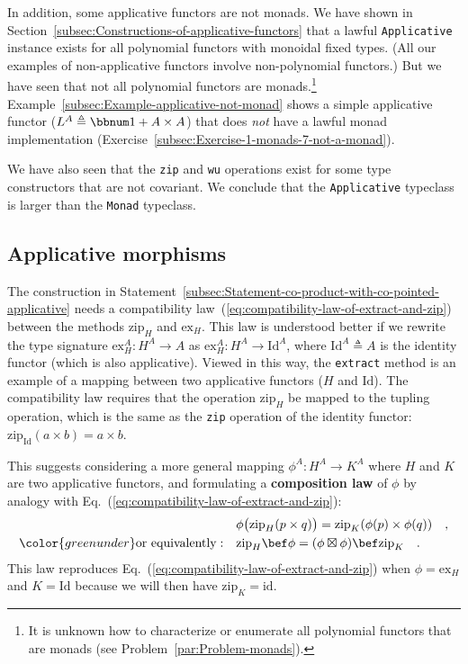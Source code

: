 In addition, some applicative functors are not monads. We have shown
in Section~\ref{subsec:Constructions-of-applicative-functors} that
a lawful \lstinline!Applicative! instance exists for all polynomial
functors with monoidal fixed types. (All our examples of non-applicative
functors involve non-polynomial functors.) But we have seen that not
all polynomial functors are monads.\footnote{It is unknown how to characterize or enumerate all polynomial functors
that are monads (see Problem~\ref{par:Problem-monads}).} Example~\ref{subsec:Example-applicative-not-monad} shows a simple
applicative functor ($L^{A}\triangleq\bbnum 1+A\times A$)
that does \emph{not} have a lawful monad implementation (Exercise~\ref{subsec:Exercise-1-monads-7-not-a-monad}).

We have also seen that the \lstinline!zip! and \lstinline!wu! operations
exist for some type constructors that are not covariant. We conclude
that the \lstinline!Applicative! typeclass is larger than the \lstinline!Monad!
typeclass.

\subsection{Applicative morphisms\label{subsec:Applicative-morphisms}}

The construction in Statement~\ref{subsec:Statement-co-product-with-co-pointed-applicative}
needs a compatibility law~(\ref{eq:compatibility-law-of-extract-and-zip})
between the methods $\text{zip}_{H}$ and $\text{ex}_{H}$. This law
is understood better if we rewrite the type signature $\text{ex}_{H}^{A}:H^{A}\rightarrow A$
as $\text{ex}_{H}^{A}:H^{A}\rightarrow\text{Id}^{A}$, where $\text{Id}^{A}\triangleq A$
is the identity functor (which is also applicative). Viewed in this
way, the \lstinline!extract! method is an example of a mapping between
two applicative functors ($H$ and $\text{Id}$). The compatibility
law requires that the operation $\text{zip}_{H}$ be mapped to the
tupling operation, which is the same as the \lstinline!zip! operation
of the identity functor: $\text{zip}_{\text{Id}}(a\times b)=a\times b$.

This suggests considering a more general mapping $\phi^{A}:H^{A}\rightarrow K^{A}$
where $H$ and $K$ are two applicative functors, and formulating
a \textbf{composition law}
of $\phi$ by analogy with Eq.~(\ref{eq:compatibility-law-of-extract-and-zip}):
\begin{align*}
 & \phi\big(\text{zip}_{H}(p\times q)\big)=\text{zip}_{K}(\phi(p)\times\phi(q))\quad,\\
{\color{greenunder}\text{or equivalently}:}\quad & \text{zip}_{H}\bef\phi=(\phi\boxtimes\phi)\bef\text{zip}_{K}\quad.
\end{align*}
This law reproduces Eq.~(\ref{eq:compatibility-law-of-extract-and-zip})
when $\phi=\text{ex}_{H}$ and $K=\text{Id}$ because we will then
have $\text{zip}_{K}=\text{id}$. 

